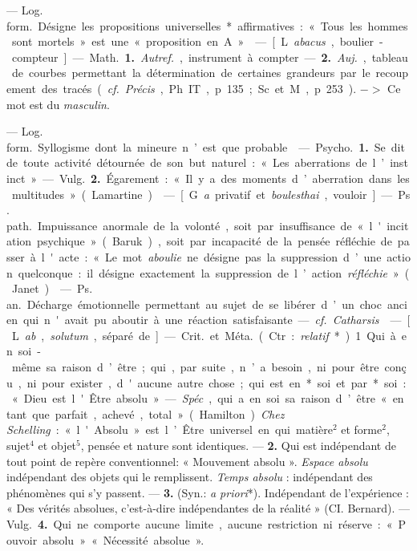 
	\begin{itemize}[leftmargin=1cm, label=, itemsep=1pt]

 — \si{Log. form.} Désigne les propositions universelles*
affirmatives :
« Tous les hommes sont mortels »
est une « proposition en A ».

 — [L. {\it abacus}, boulier-compteur]
— \si{Math.} {\bf 1.} {\it Autref.}, instrument
à compter. — {\bf 2.} {\it Auj.}, tableau
de courbes permettant la détermination
de certaines grandeurs par
le recoupement des tracés ({\it cf.} {\it Précis},
Ph. IT, p. 135; Sc. et M., p. 253).
$->$ Ce mot est du {\it masculin}.

 — \si{Log. form.} Syllogisme
dont la mineure n’est que probable.

 — \si{Psycho.} {\bf 1.} Se dit de
toute activité détournée de son but
naturel : « Les aberrations de l’instinct ».
— \si{Vulg.} {\bf 2.} Égarement : « Il
y a des moments d’aberration dans
les multitudes » (Lamartine).

 — [G. {\it a}  privatif et {\it boulesthai},
vouloir] — \si{Ps. path.} Impuissance
anormale de la volonté, soit par
insuffisance de « l'incitation psychique »
(Baruk), soit par incapacité
de la pensée réfléchie de passer à
l'acte : « Le mot {\it aboulie} ne désigne
pas la suppression d’une action quelconque :
il désigne exactement la
suppression de l’action {\it réfléchie} »
(Janet).

 — \si{Ps. an.} Décharge émotionnelle
permettant au sujet de se
libérer d’un choc ancien qui n'avait
pu aboutir à une réaction satisfaisante.
— {\it cf.}  {\it Catharsis}.

 — [L. {\it ab}, {\it solutum}, séparé de]
— \si{Crit.} et \si{Méta.} (Ctr. : {\it relatif}*).
1. Qui à en soi-même sa raison
d’être; qui, par suite, n’a besoin, ni
pour être conçu, ni pour exister,
d'aucune autre chose; qui est en*
soi et par* soi : « Dieu est l'Être
absolu ». — {\it Spéc}., qui a en soi sa
raison d’être « en tant que parfait,
achevé, total » (Hamilton). {\it Chez
Schelling} : « l'Absolu » est l’Être
universel en qui matière$^2$ et forme$^2$,
sujet$^4$ et objet$^5$, pensée et nature
sont identiques. — {\bf 2.} Qui est indépendant
de tout point de repère
conventionnel: « Mouvement absolu ».
{\it Espace absolu} indépendant des
objets qui le remplissent. {\it Temps
absolu} : indépendant des phénomènes
qui s’y passent. — {\bf 3.} (Syn.: {\it a priori}*).
Indépendant de l'expérience : « Des
vérités absolues, c’est-à-dire indépendantes
de la réalité » (CI. Bernard).
— \si{Vulg.} {\bf 4.} Qui ne comporte
aucune limite, aucune restriction
ni réserve : « Pouvoir absolu »
« Nécessité absolue ».


\end{itemize}
